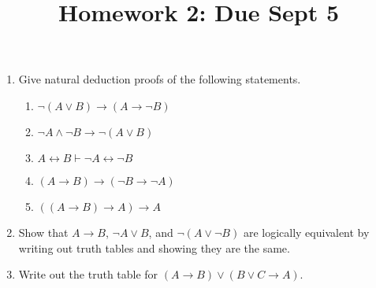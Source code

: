 \documentclass[12pt]{amsart}
\theoremstyle{definition}
\begin{document}
\title{Homework 2: Due Sept 5}

\maketitle

\begin{enumerate}
	\item Give natural deduction proofs of the following statements. 

	\begin{enumerate}

	\item $\neg(A \lor B) \to (A \to \neg B)$ 
	\item $\neg A \land \neg B \to \neg (A \lor B)$
	\item $A \leftrightarrow B \vdash \neg A \leftrightarrow \neg B$
	\item $(A \to B) \to (\neg B \to \neg A)$
	\item $((A \to B) \to A) \to A$
	
	\end{enumerate}

	\item Show that $A \to B$, $\neg A \lor B$, and $\neg (A \lor \neg B)$ are logically 
		equivalent by writing out truth tables and showing they are the same.

	\item Write out the truth table for $(A \to B) \lor (B \lor C \to A)$. 

\end{enumerate}
\end{document}
